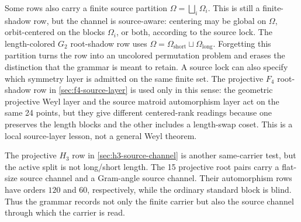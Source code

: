 Some rows also carry a finite source partition \(\Omega=\bigsqcup_i\Omega_i\).  This is still a finite-shadow row, but the channel is source-aware: centering may be global on \(\Omega\), orbit-centered on the blocks \(\Omega_i\), or both, according to the source lock.  The length-colored \(G_2\) root-shadow row uses \(\Omega=\Omega_{\mathrm{short}}\sqcup\Omega_{\mathrm{long}}\).  Forgetting this partition turns the row into an uncolored permutation problem and erases the distinction that the grammar is meant to retain.
A source lock can also specify which symmetry layer is admitted on the same finite set.  The projective \(F_4\) root-shadow row in \cref{sec:f4-source-layer} is used only in this sense: the geometric projective Weyl layer and the source matroid automorphism layer act on the same 24 points, but they give different centered-rank readings because one preserves the length blocks and the other includes a length-swap coset.  This is a local source-layer lesson, not a general Weyl theorem.

The projective \(H_3\) row in \cref{sec:h3-source-channel} is another same-carrier test, but the active split is not long/short length.  The 15 projective root pairs carry a flat-size source channel and a Gram-angle source channel.  Their automorphism rows have orders \(120\) and \(60\), respectively, while the ordinary standard block is blind.  Thus the grammar records not only the finite carrier but also the source channel through which the carrier is read.


